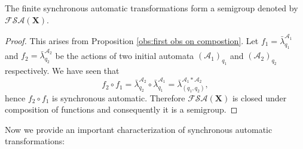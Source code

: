 \documentclass[mat1]{fmfdeloTS2.0}
\newcommand{\abece}{\mathbf{X}}			%
\newcommand{\auto}{\mathcal}			%
\newcommand{\semisynaut}{\mathcal{FSA}}	%
\newcommand{\LAMBDA}{\bar{\lambda}}			%
\begin{document}
\begin{proposition}
The finite synchronous automatic transformations form a semigroup denoted by $\semisynaut(\abece)$.
\end{proposition}
\begin{proof}
This arises from Proposition \autoref{obs:first obs on compostion}. Let $f_1=\LAMBDA^{\auto{A}_1}_{q_1}$ and $f_2=\LAMBDA^{\auto{A}_2}_{q_2}$ be the actions of two initial automata $(\auto{A}_1)_{q_1}$ and $(\auto{A}_2)_{q_2}$ respectively. We have seen that 
$$f_2 \circ f_1 = \LAMBDA^{\auto{A}_2}_{q_2} \circ \LAMBDA^{\auto{A}_1}_{q_1} = \LAMBDA^{\auto{A}_1*\auto{A}_2}_{(q_1,q_2)},$$
hence $f_2 \circ f_1$ is synchronous automatic. Therefore $\semisynaut(\abece)$ is closed under composition of functions and consequently it is a semigroup.
\end{proof}

Now we provide an important characterization of synchronous automatic transformations:
\end{document}
